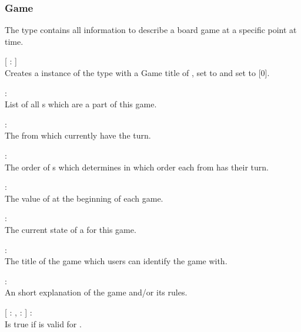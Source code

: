 \subsubsection{Game}
The  type contains all information to describe a board game at a specific point at time.

\begin{dlist}
  \item {}[ : ]\\
  Creates a instance of the  type with a Game title of ,  set to  and  set to [0].
  
  \item {} : \\
  List of all s which are a part of this game.
  
  \item {} : \\
  The  from  which currently have the turn.
  
  \item {} : \\
  The order of s which determines in which order each  from  has their turn.
  
  \item {} : \\
  The value of  at the beginning of each game.
  
  \item {} : \\
  The current state of a  for this game.
  
  \item {} : \\
  The title of the game which users can identify the game with.
  
  \item {} : \\
  An short explanation of the game and/or its rules.
  
  \item {}[  : ,  :  ] : \\
  Is true if  is valid for .
  

\end{dlist}
